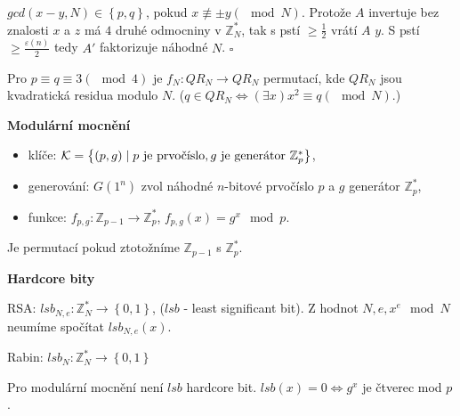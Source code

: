 \documentclass[a4paper,12pt,titlepage]{article}
\def\podnadpis#1{{\bigskip\bf\noindent#1\medskip\par}}
\def\qed{{\hfill{$\square$}}}
\begin{document}
$gcd\left(x-y, N\right) \in \left\lbrace p, q\right\rbrace$, pokud $x \not\equiv \pm y \left(\mod N\right)$. Protože $A$ invertuje bez znalosti $x$ a $z$ má $4$ druhé odmocniny v $\mathbb{Z}_N^\ast$, tak s pstí $\ge \frac{1}{2}$ vrátí $A$  $y$. S pstí $\ge \frac{\varepsilon\left(n\right)}{2}$ tedy $A'$ faktorizuje náhodné $N$. 
\qed

Pro $p \equiv q \equiv 3 \left(\mod 4 \right)$ je $f_N: QR_N \rightarrow QR_N$ permutací, kde $QR_N$ jsou kvadratická residua modulo $N$. ($q \in QR_N \Longleftrightarrow \left(\exists{x}\right) x^2 \equiv q \left(\mod N\right)$.)

\podnadpis{Modulární mocnění}
\begin{itemize}
  \item klíče: $\mathcal{K} = \left\lbrace\left(p,g\right)\mid p \hbox{ je prvočíslo}, g \hbox{ je generátor }\mathbb{Z}_p^\ast \right\rbrace$,
  \item generování: $G\left(1^n\right)$ zvol náhodné $n$-bitové prvočíslo $p$ a $g$ generátor $\mathbb{Z}_p^\ast$,
  \item funkce: $f_{p,g}: \mathbb{Z}_{p-1} \rightarrow \mathbb{Z}_p^\ast$, $f_{p,g}\left(x\right) = g^x \mod p$.
\end{itemize}

Je permutací pokud ztotožníme $\mathbb{Z}_{p-1}$ s $\mathbb{Z}_p^\ast$.

\podnadpis{Hardcore bity}

RSA: $lsb_{N,e}: \mathbb{Z}_N^\ast \rightarrow \left\lbrace 0,1\right\rbrace$, ($lsb$ - least significant bit). Z hodnot $N, e, x^e \mod N$ neumíme spočítat $lsb_{N,e}\left(x\right)$.

Rabin: $lsb_{N}: \mathbb{Z}_N^\ast \rightarrow \left\lbrace 0,1\right\rbrace$
 
Pro modulární mocnění není $lsb$ hardcore bit. $lsb\left(x\right) = 0 \Leftrightarrow g^x$ je čtverec mod $p$.
\end{document}
